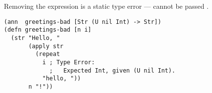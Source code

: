 Removing the  expression is a static type error
---  cannot be passed .

\begin{verbatim}
(ann  greetings-bad [Str (U nil Int) -> Str])
(defn greetings-bad [n i]
  (str "Hello, "
       (apply str 
         (repeat 
           i ; Type Error:
             ;   Expected Int, given (U nil Int).
           "hello, "))
       n "!"))
\end{verbatim}



%
%
%
%
%
%
%


